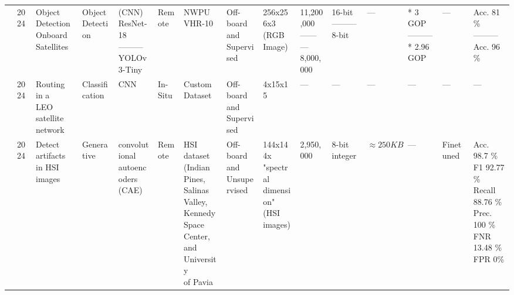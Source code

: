 \begin{center}
{\begin{tabular}{lllllllllllllll}
\cite{shaoConfigurableAcceleratorCNNBased2024} & 2024 & \makecell[tl]{Object Detection\\ Onboard Satellites} & \makecell[tl]{Object\\ Detection} & \makecell[tl]{(CNN)\\ ResNet-18\\ ---------\\ YOLOv3-Tiny} & Remote & NWPU VHR-10 & \makecell[tl]{Off-board\\ and\\ Supervised} & \makecell[tl]{256x256x3\\ (RGB Image)} & \makecell[tl]{11,200,000\\ ---------\\ 8,000,000} & \makecell[tl]{16-bit\\ ---------\\ 8-bit} & --- & \makecell[tl]{* 3 GOP\\ ---------\\ * 2.96 GOP} & --- & \makecell[tl]{Acc. 81 \%\\ ---------\\ Acc. 96 \%}  \\ 
\cite{kimFPGAAcceleratedCNNParallelized2024} & 2024 & \makecell[tl]{Routing in a\\ LEO satellite\\ network} & Classification & CNN & In-Situ & \makecell[tl]{Custom\\ Dataset} & \makecell[tl]{Off-board\\ and\\ Supervised} & 4x15x15 & --- & --- & --- & --- & --- & --- \\ \hline
\cite{castelinoEnergyEfficientArtefactDetection2024} & 2024 & \makecell[tl]{Detect artifacts\\ in HSI images} & Generative & \makecell[tl]{convolutional\\ autoencoders\\ (CAE)} & Remote & \makecell[tl]{HSI dataset\\ (Indian Pines,\\ Salinas Valley,\\ Kennedy\\ Space Center,\\ and University\\ of Pavia} & \makecell[tl]{Off-board\\ and\\ Unsupervised} & \makecell[tl]{144x144x\\"spectral\\ dimension"\\ (HSI images)} & 2,950,000 & 8-bit integer & $\approx 250 KB$ & --- & Finetuned & \makecell[tl]{Acc. 98.7 \%\\ F1 92.77 \%\\ Recall 88.76 \%\\ Prec. 100 \%\\ FNR 13.48 \%\\ FPR 0\%}  \\ \hline

\end{tabular}}
\end{center}
